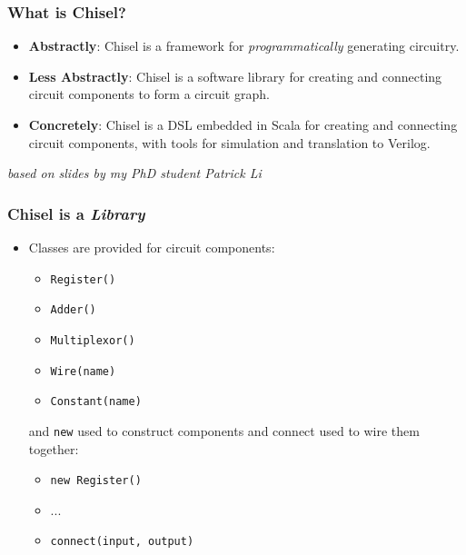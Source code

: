 
\begin{frame}[fragile]
\frametitle{What is Chisel?}
\vfill
\begin{itemize}
\item {\bf Abstractly}: Chisel is a framework for {\it programmatically} generating circuitry.
\item {\bf Less Abstractly}: Chisel is a software library for creating and connecting circuit components to form a circuit graph.
\item {\bf Concretely}: Chisel is a DSL embedded in Scala for creating and connecting circuit components, with tools for simulation and translation to Verilog.
\end{itemize}
\vspace{3.5cm}
{\it\small * based on slides by my PhD student Patrick Li}
\end{frame}

\begin{frame}[fragile]
\frametitle{Chisel is a {\it Library}}
\begin{itemize}
\item Classes are provided for circuit components:
\begin{itemize}
\item \verb+Register()+
\item \verb+Adder()+
\item \verb+Multiplexor()+
\item \verb+Wire(name)+
\item \verb+Constant(name)+
\end{itemize}

\noindent
and \verb+new+ used to construct components and connect used to wire them together:
\begin{itemize}
\item \verb+new Register()+
\item ...
\item \verb+connect(input, output)+
\end{itemize}
\end{itemize}
\end{frame}


